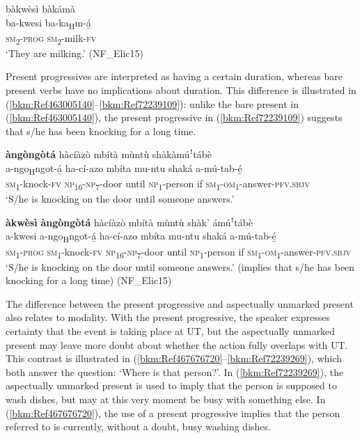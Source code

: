 \ea
\label{bkm:Ref72239029}
bàkwèsì bàkámà\\
\gll ba-kwesi  ba-ka\textsubscript{H}m-á̲\\
\textsc{sm}\textsubscript{2}-\textsc{prog}  \textsc{sm}\textsubscript{2}-milk-\textsc{fv}\\
\glt ‘They are milking.’ (NF\_Elic15)
\z

Present progressives are interpreted as having a certain duration, whereas bare present verbs have no implications about duration. This difference is illustrated in (\ref{bkm:Ref463005140}--\ref{bkm:Ref72239109}): unlike the bare present in (\ref{bkm:Ref463005140}), the present progressive in (\ref{bkm:Ref72239109}) suggests that s/he has been knocking for a long time.

\ea
\label{bkm:Ref463005140}
\textbf{àngòngòtá} hàcíàzò mbítà mùntù shàkàmúꜝtábè\\
\gll a-ngo\textsubscript{H}ngot-á̲  ha-cí-azo mbíta  mu-ntu  shaká  a-mú-tab-é̲ \\
\textsc{sm}\textsubscript{1}-knock-\textsc{fv}  \textsc{np}\textsubscript{16}-\textsc{np}\textsubscript{7}-door
until  \textsc{np}\textsubscript{1}-person  if  \textsc{sm}\textsubscript{1}-\textsc{om}\textsubscript{1}-answer-\textsc{pfv}.\textsc{sbjv}\\
\glt ‘S/he is knocking on the door until someone answers.’
\z

\ea
\label{bkm:Ref72239109}
\textbf{àkwèsì} \textbf{àngòngòtá} hàcíàzò mbítà mùntù shàk’ ámúꜝtábè\\
\gll a-kwesi  a-ngo\textsubscript{H}ngot-á̲  ha-cí-azo mbíta  mu-ntu  shaká  a-mú-tab-é̲ \\
\textsc{sm}\textsubscript{1}-\textsc{prog}  \textsc{sm}\textsubscript{1}-knock-\textsc{fv}  \textsc{np}\textsubscript{16}-\textsc{np}\textsubscript{7}-door
until  \textsc{np}\textsubscript{1}-person  if  \textsc{sm}\textsubscript{1}-\textsc{om}\textsubscript{1}-answer-\textsc{pfv}.\textsc{sbjv}\\
\glt ‘S/he is knocking on the door until someone answers.’ (implies that s/he has been knocking for a long time) (NF\_Elic15)
\z

The difference between the present progressive and aspectually unmarked present also relates to modality. With the present progressive, the speaker expresses certainty that the event is taking place at UT, but the aspectually unmarked present may leave more doubt about whether the action fully overlaps with UT. This contrast is illustrated in (\ref{bkm:Ref467676720}--\ref{bkm:Ref72239269}), which both answer the question: ‘Where is that person?’. In (\ref{bkm:Ref72239269}), the aspectually unmarked present is used to imply that the person is supposed to wash dishes, but may at this very moment be busy with something else. In (\ref{bkm:Ref467676720}), the use of a present progressive implies that the person referred to is currently, without a doubt, busy washing dishes.

